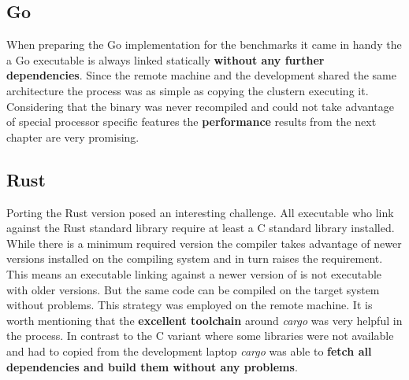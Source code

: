 \subsection*{Go}
\label{subsec:Implementation::ClusterPreparation::Go}

When preparing the Go implementation for the benchmarks it came in handy the a Go executable is always linked statically \textbf{without any further dependencies}. Since the remote machine and the development shared the same architecture the process was as simple as copying the clustern executing it. Considering that the binary was never recompiled and could not take advantage of special processor specific features the \textbf{performance} results from the next chapter are very promising.

\subsection*{Rust}
\label{subsec:Implementation::ClusterPreparation::Rust}

Porting the Rust version posed an interesting challenge. All executable who link against the Rust standard library require at least a C standard library installed. While there is a minimum required version the compiler takes advantage of newer versions installed on the compiling system and in turn raises the requirement. This means an executable linking against a newer version of  is not executable with older versions. But the same code can be compiled on the target system without problems. This strategy was employed on the remote machine. It is worth mentioning that the \textbf{excellent toolchain} around \textit{cargo} was very helpful in the process. In contrast to the C variant where some libraries were not available and had to copied from the development laptop \textit{cargo} was able to \textbf{fetch all dependencies and build them without any problems}.
